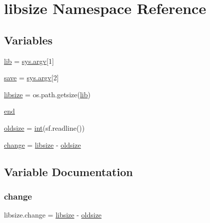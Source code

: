 \hypertarget{namespacelibsize}{}\section{libsize Namespace Reference}
\label{namespacelibsize}
\subsection*{Variables}
\begin{DoxyCompactItemize}
\item 
\mbox{\hyperlink{namespacelibsize_aebe401e0d6ac1f39df37ccbcbb02fcd6}{lib}} = \mbox{\hyperlink{pythonrun_8h_af3cb49c013b6d4b79e7a00fc6807e954}{sys.\+argv}}\mbox{[}1\mbox{]}
\item 
\mbox{\hyperlink{namespacelibsize_a54b9405a54b4089591f0941f0f5eae9b}{save}} = \mbox{\hyperlink{pythonrun_8h_af3cb49c013b6d4b79e7a00fc6807e954}{sys.\+argv}}\mbox{[}2\mbox{]}
\item 
\mbox{\hyperlink{namespacelibsize_ad37fa50fa82936587fef9eb4a4e6bb5b}{libsize}} = os.\+path.\+getsize(\mbox{\hyperlink{namespacelibsize_aebe401e0d6ac1f39df37ccbcbb02fcd6}{lib}})
\item 
\mbox{\hyperlink{namespacelibsize_a5957fc1e6f6b0ee7cd77e1e062369d35}{end}}
\item 
\mbox{\hyperlink{namespacelibsize_a639adbdcebcdf2f4fc0eb0c7a4a7f546}{oldsize}} = \mbox{\hyperlink{warnings_8h_a74f207b5aa4ba51c3a2ad59b219a423b}{int}}(sf.\+readline())
\item 
\mbox{\hyperlink{namespacelibsize_adb4c8848462332fbccbdc829fae79d40}{change}} = \mbox{\hyperlink{namespacelibsize_ad37fa50fa82936587fef9eb4a4e6bb5b}{libsize}} -\/ \mbox{\hyperlink{namespacelibsize_a639adbdcebcdf2f4fc0eb0c7a4a7f546}{oldsize}}
\end{DoxyCompactItemize}


\subsection{Variable Documentation}
\mbox{\label{namespacelibsize_adb4c8848462332fbccbdc829fae79d40}} 
\subsubsection{\texorpdfstring{change}{change}}
{\footnotesize\ttfamily libsize.\+change = \mbox{\hyperlink{namespacelibsize_ad37fa50fa82936587fef9eb4a4e6bb5b}{libsize}} -\/ \mbox{\hyperlink{namespacelibsize_a639adbdcebcdf2f4fc0eb0c7a4a7f546}{oldsize}}}

